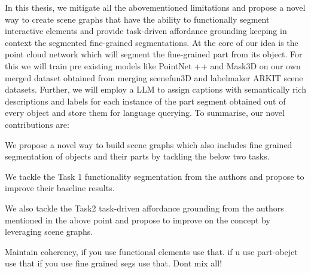In this thesis, we mitigate all the abovementioned limitations and propose
a novel way to create scene graphs that have the ability to functionally segment
interactive elements and provide task-driven affordance grounding keeping in context the 
segmented fine-grained segmentations. At the core of our idea is the 
point cloud network which will segment the fine-grained part from its object. For this we will train pre existing 
models like PointNet ++ and Mask3D on our own merged dataset obtained from merging scenefun3D and labelmaker
ARKIT scene datasets. Further, we will employ a LLM to assign captions with semantically rich descriptions and 
labels for each instance of the part segment 
obtained out of every object and store them for language querying. 
To summarise, our novel contributions are:
\begin{compactenum}[.]
\item We propose a novel way to build scene graphs which also includes fine grained segmentation of objects and their parts by tackling the below two tasks.
\item We tackle the Task 1 functionality segmentation from the authors \citet{delitzas2024scenefun3d} and propose to improve their 
baseline results.
\item We also tackle the Task2 task-driven affordance grounding from the authors mentioned in the above point 
and propose to improve on the concept by leveraging scene graphs.
\end{compactenum}


Maintain coherency, if you use functional elements use that. if u use part-obejct use that if you use fine grained segs use that. Dont mix all!
